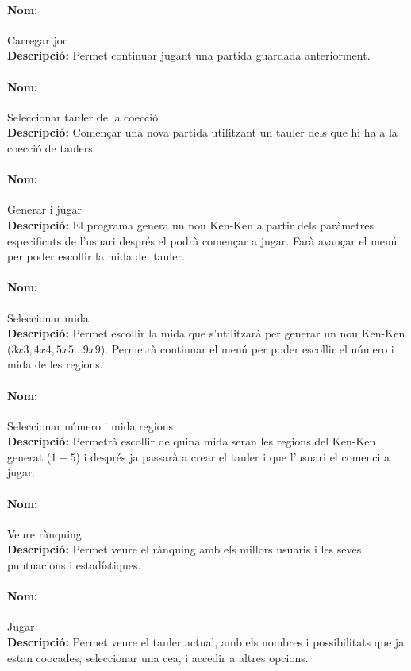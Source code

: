 \documentclass[a4paper,12pt]{article}
\begin{document}
\paragraph{Nom:} Carregar joc \\
\textbf{Descripció:}
Permet continuar jugant una partida guardada anteriorment.

\paragraph{Nom:} Seleccionar tauler de la co\lgem ecció \\
\textbf{Descripció:}
Començar una nova partida utilitzant un tauler dels que hi ha a la co\lgem ecció de taulers.

\paragraph{Nom:} Generar i jugar \\
\textbf{Descripció:}
El programa genera un nou Ken-Ken a partir dels paràmetres especificats de l'usuari després el podrà començar a jugar. Farà avançar el menú per poder escollir la mida del tauler.

\paragraph{Nom:} Seleccionar mida \\
\textbf{Descripció:}
Permet escollir la mida que s'utilitzarà per generar un nou Ken-Ken ($3x3, 4x4, 5x5... 9x9$).
Permetrà continuar el menú per poder escollir el número i mida de les regions.

\paragraph{Nom:} Seleccionar número i mida regions \\
\textbf{Descripció:} 
Permetrà escollir de quina mida seran les regions del Ken-Ken generat ($1 - 5$) i després ja passarà a crear el tauler i que l'usuari el comenci a jugar.

\paragraph{Nom:} Veure rànquing\\
\textbf{Descripció:} 
Permet veure el rànquing amb els millors usuaris i les seves puntuacions i estadístiques.

\paragraph{Nom:} Jugar\\
\textbf{Descripció:} 
Permet veure el tauler actual, amb els nombres i possibilitats que ja estan co\lgem ocades, seleccionar una ce\lgem a, i accedir a altres opcions.
\end{document}

